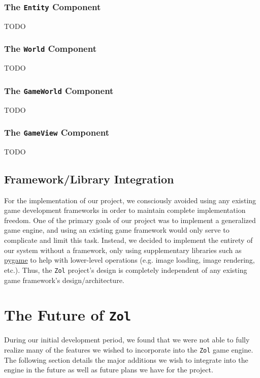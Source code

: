\documentclass{article}
\newcommand{\classname}[1] {\texttt{#1} }
\newcommand{\projectname}[0] {\texttt{Zol} }
\begin{document}
			\subsubsection[\classname{Entity}]{The \classname{Entity} Component}
			TODO

			\subsubsection[\classname{World}]{The \classname{World} Component}
			TODO

			\subsubsection[\classname{GameWorld}]{The \classname{GameWorld} Component}
			TODO

			\subsubsection[\classname{GameView}]{The \classname{GameView} Component}
			TODO

		\subsection{Framework/Library Integration}
		For the implementation of our project, we consciously avoided using any
		existing game development frameworks in order to maintain complete
		implementation freedom.  One of the primary goals of our project was
		to implement a generalized game engine, and using an existing game
		framework would only serve to complicate and limit this task.  Instead, 
		we decided to implement the entirety of our system without a framework, 
		only using supplementary libraries such as 
		\href{http://www.pygame.org/news.html}{pygame} to help with lower-level 
		operations (e.g. image loading, image rendering, etc.).  Thus, the
		\projectname project's design is completely independent of any existing 
		game framework's design/architecture.


	\section[Future Plans]{The Future of \projectname}
	During our initial development period, we found that we were not able to
	fully realize many of the features we wished to incorporate into the
	\projectname game engine.  The following section details the major additions
	we wish to integrate into the engine in the future as well as future plans 
	we have for the project.
\end{document}
